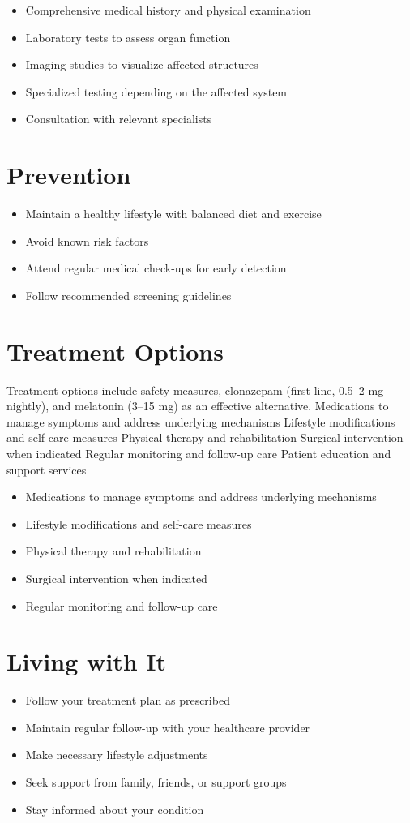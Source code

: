 \begin{itemize}[noitemsep]
  \item Comprehensive medical history and physical examination
  \item Laboratory tests to assess organ function
  \item Imaging studies to visualize affected structures
  \item Specialized testing depending on the affected system
  \item Consultation with relevant specialists
\end{itemize}
\section{Prevention}
\begin{itemize}[noitemsep]
  \item Maintain a healthy lifestyle with balanced diet and exercise
  \item Avoid known risk factors
  \item Attend regular medical check-ups for early detection
  \item Follow recommended screening guidelines
\end{itemize}
\section{Treatment Options}
Treatment options include safety measures, clonazepam (first-line, 0.5--2 mg nightly), and melatonin (3--15 mg) as an effective alternative. Medications to manage symptoms and address underlying mechanisms Lifestyle modifications and self-care measures Physical therapy and rehabilitation Surgical intervention when indicated Regular monitoring and follow-up care Patient education and support services

\begin{itemize}[noitemsep]
  \item Medications to manage symptoms and address underlying mechanisms
  \item Lifestyle modifications and self-care measures
  \item Physical therapy and rehabilitation
  \item Surgical intervention when indicated
  \item Regular monitoring and follow-up care
\end{itemize}
\section{Living with It}
\begin{itemize}[noitemsep]
  \item Follow your treatment plan as prescribed
  \item Maintain regular follow-up with your healthcare provider
  \item Make necessary lifestyle adjustments
  \item Seek support from family, friends, or support groups
  \item Stay informed about your condition
\end{itemize}
